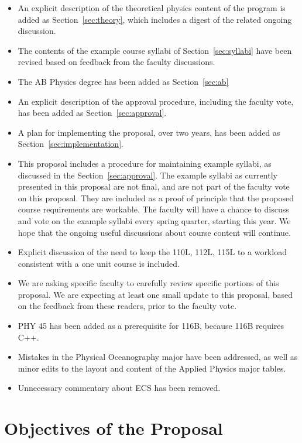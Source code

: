 \documentclass[12pt]{article}
\begin{document}
\begin{itemize}
  
 \item An explicit description of the theoretical physics content of
   the program is added as Section~\ref{sec:theory}, which includes a
   digest of the related ongoing discussion.
 \item The contents of the example course syllabi of
   Section~\ref{sec:syllabi} have been revised based on feedback from
   the faculty discussions. 
 \item The AB Physics degree has been added as Section~\ref{sec:ab}
 \item An explicit description of the approval procedure, including
   the faculty vote, has been added as Section~\ref{sec:approval}.
 \item A plan for implementing the proposal, over two years, has been
   added as Section~\ref{sec:implementation}.
 \item This proposal includes a procedure for maintaining example
   syllabi, as discussed in the Section~\ref{sec:approval}.  The
   example syllabi as currently presented in this proposal are not
   final, and are not part of the faculty vote on this proposal.  They
   are included as a proof of principle that the proposed course
   requirements are workable.  The faculty will have a chance to
   discuss and vote on the example syllabi every spring quarter,
   starting this year.  We hope that the ongoing useful discussions
   about course content will continue.   
 \item Explicit discussion of the need to keep the 110L, 112L, 115L to
   a workload consistent with a one unit course is included.
 \item We are asking specific faculty to carefully review specific
   portions of this proposal.  We are expecting at least one small
   update to this proposal, based on the feedback from these readers,
   prior to the faculty vote.   
 \item PHY 45 has been added as a prerequisite for 116B, because 116B requires C++.
 \item Mistakes in the Physical Oceanography major have been
   addressed, as well as minor edits to the layout and content of the
   Applied Physics major tables.   
 \item Unnecessary commentary about ECS has been removed.
\end{itemize}

\section{Objectives of the Proposal}
\end{document}
